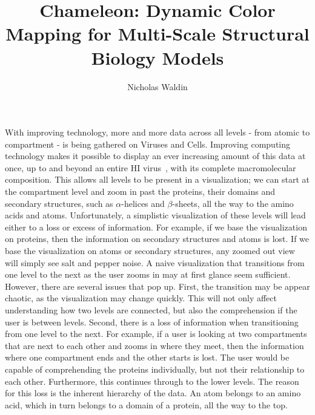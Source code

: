 \documentclass[review,journal]{vgtc}         %
\title{Chameleon: Dynamic Color Mapping	for Multi-Scale Structural Biology Models}
\author{Nicholas Waldin}
\begin{document}

\maketitle

With improving technology, more and more data across all levels - from atomic to compartment - is being gathered on Viruses and Cells. 
Improving computing technology makes it possible to display an ever increasing amount of this data at once, up to and beyond an entire HI virus~\cite{muzic2015cellview}, with its complete macromolecular composition.
This allows all levels to be present in a visualization; we can start at the compartment level and zoom in past the proteins, their domains and secondary structures, such as $\alpha$-helices and $\beta$-sheets, all the way to the amino acids and atoms.
Unfortunately, a simplistic visualization of these levels will lead either to a loss or excess of information.
For example, if we base the visualization on proteins, then the information on secondary structures and atoms is lost. 
If we base the visualization on atoms or secondary structures, any zoomed out view will simply see salt and pepper noise. 
A naive visualization that transitions from one level to the next as the user zooms in may at first glance seem sufficient.
However, there are several issues that pop up.
First, the transition may be appear chaotic, as the visualization may change quickly.
This will not only affect understanding how two levels are connected, but also the comprehension if the user is between levels.
Second, there is a loss of information when transitioning from one level to the next. 
For example, if a user is looking at two compartments that are next to each other and zooms in where they meet, then the information where one compartment ends and the other starts is lost. 
The user would be capable of comprehending the proteins individually, but not their relationship to each other.
Furthermore, this continues through to the lower levels. 
The reason for this loss is the inherent hierarchy of the data.
An atom belongs to an amino acid, which in turn belongs to a domain of a protein, all the way to the top.
\end{document}
